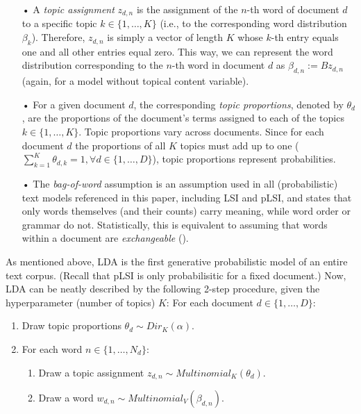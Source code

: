 \begin{itemize}
\vspace{-0.25cm}
\item[•] A \textit{topic assignment} $z_{d,n}$ is the assignment of the $n$-th word of document $d$ to a specific topic $k \in \{1,\dots,K\}$ (i.e., to the corresponding word distribution $\beta_k$). Therefore, $z_{d,n}$ is simply a vector of length $K$ whose $k$-th entry equals one and all other entries equal zero. This way, we can represent the word distribution corresponding to the $n$-th word in document $d$ as $\beta_{d,n}:=Bz_{d,n}$ (again, for a model without topical content variable).
\vspace{-0.25cm}
\item[•] For a given document $d$, the corresponding \textit{topic proportions}, denoted by $\theta_d$, are the proportions of the document's terms assigned to each of the topics $k \in \{1,\dots,K\}$. Topic proportions vary across documents. Since for each document $d$ the proportions of all $K$ topics must add up to one ($\sum_{k=1}^{K}\theta_{d,k}=1, \forall d \in \{1,\dots,D\}$), topic proportions represent probabilities.
\vspace{-0.25cm}
\item[•] The \textit{bag-of-word} assumption is an assumption used in all (probabilistic) text models referenced in this paper, including LSI and pLSI, and states that only words themselves (and their counts) carry meaning, while word order or grammar do not. Statistically, this is equivalent to assuming that words within a document are \textit{exchangeable} (\citealp{aldous1985exchangeability}).

\end{itemize}

As mentioned above, LDA is the first generative probabilistic model of an entire text corpus. (Recall that pLSI is only probabilisitic for a fixed document.) Now, LDA can be neatly described by the following 2-step procedure, given the hyperparameter (number of topics) $K$:
\vspace{0.25cm}
\noindent
For each document $d \in \{1,\dots,D\}$:

\begin{enumerate}[{1)}]
\vspace{-0.25cm}
\item Draw topic proportions $\theta_d \sim Dir_K(\alpha)$.
\vspace{-0.25cm}
\item For each word $n \in \{1,\dots,N_d\}$:
	\begin{enumerate}[{a)}]
	\vspace{-0.25cm}    
    \item Draw a topic assignment $z_{d,n} \sim Multinomial_K(\theta_d)$.
	\vspace{-0.25cm}    
    \item Draw a word $w_{d,n} \sim Multinomial_V(\beta_{d,n})$.
	\end{enumerate}
\end{enumerate}

